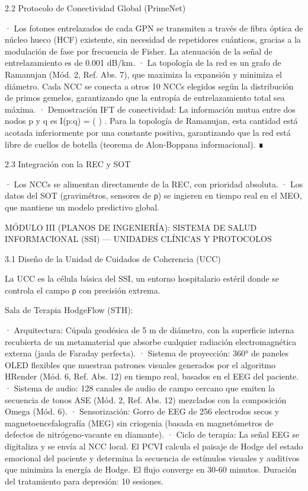 \documentclass[12pt,a4paper]{book}
\begin{document}
2.2 Protocolo de Conectividad Global (PrimeNet)

· Los fotones entrelazados de cada GPN se transmiten a través de fibra óptica de núcleo hueco (HCF) existente, sin necesidad de repetidores cuánticos, gracias a la modulación de fase por frecuencia de Fisher. La atenuación de la señal de entrelazamiento es de 0.001 dB/km.
· La topología de la red es un grafo de Ramanujan (Mód. 2, Ref. Abs. 7), que maximiza la expansión y minimiza el diámetro. Cada NCC se conecta a otros 10 NCCs elegidos según la distribución de primos gemelos, garantizando que la entropía de entrelazamiento total sea máxima.
· Demostración IFT de conectividad: La información mutua entre dos nodos p y q es  I(p:q) = \ln\left(  \right) . Para la topología de Ramanujan, esta cantidad está acotada inferiormente por una constante positiva, garantizando que la red está libre de cuellos de botella (teorema de Alon‑Boppana informacional). ∎

2.3 Integración con la REC y SOT

· Los NCCs se alimentan directamente de la REC, con prioridad absoluta.
· Los datos del SOT (gravimétros, sensores de ρ) se ingieren en tiempo real en el MEO, que mantiene un modelo predictivo global.

MÓDULO III (PLANOS DE INGENIERÍA): SISTEMA DE SALUD INFORMACIONAL (SSI) — UNIDADES CLÍNICAS Y PROTOCOLOS

3.1 Diseño de la Unidad de Cuidados de Coherencia (UCC)

La UCC es la célula básica del SSI, un entorno hospitalario estéril donde se controla el campo ρ con precisión extrema.

Sala de Terapia HodgeFlow (STH):

· Arquitectura: Cúpula geodésica de 5 m de diámetro, con la superficie interna recubierta de un metamaterial que absorbe cualquier radiación electromagnética externa (jaula de Faraday perfecta).
· Sistema de proyección: 360° de paneles OLED flexibles que muestran patrones visuales generados por el algoritmo HRender (Mód. 6, Ref. Abs. 12) en tiempo real, basados en el EEG del paciente.
· Sistema de audio: 128 canales de audio de campo cercano que emiten la secuencia de tonos ASE (Mód. 2, Ref. Abs. 12) mezclados con la composición Omega (Mód. 6).
· Sensorización: Gorro de EEG de 256 electrodos secos y magnetoencefalografía (MEG) sin criogenia (basada en magnetómetros de defectos de nitrógeno‑vacante en diamante).
· Ciclo de terapia: La señal EEG se digitaliza y se envía al NCC local. El PCVI calcula el paisaje de Hodge del estado emocional del paciente y determina la secuencia de estímulos visuales y auditivos que minimiza la energía de Hodge. El flujo converge en 30‑60 minutos. Duración del tratamiento para depresión: 10 sesiones.
\end{document}

